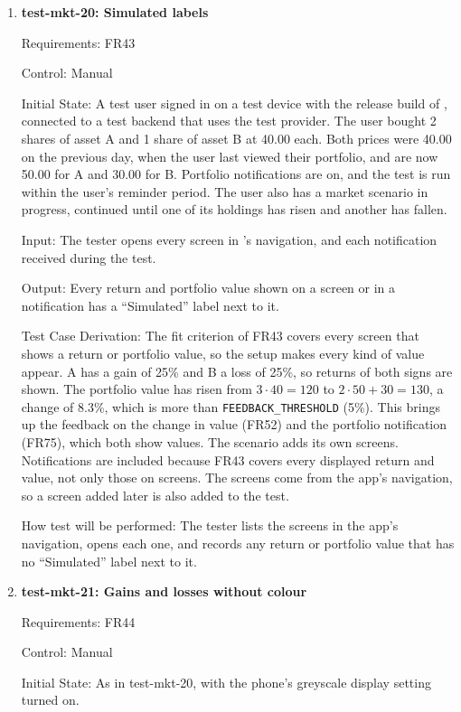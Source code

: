 \documentclass[12pt, titlepage]{article}
\begin{document}
\begin{enumerate}
\item{\textbf{test-mkt-20: Simulated labels}\\}

Requirements: FR43

Control: Manual

Initial State: A test user signed in on a test device with the release build
of \progname{}, connected to a test backend that uses the test provider. The
user bought 2 shares of asset A and 1 share of asset B at 40.00 each. Both
prices were 40.00 on the previous day, when the user last viewed their
portfolio, and are now 50.00 for A and 30.00 for B. Portfolio notifications
are on, and the test is run within the user's reminder period. The user also
has a market scenario in progress, continued until one of its holdings has
risen and another has fallen.

Input: The tester opens every screen in \progname{}'s navigation, and each
notification received during the test.

Output: Every return and portfolio value shown on a screen or in a
notification has a ``Simulated'' label next to it.

Test Case Derivation: The fit criterion of FR43 covers every screen that shows
a return or portfolio value, so the setup makes every kind of value appear. A
has a gain of 25\% and B a loss of 25\%, so returns of both signs are shown.
The portfolio value has risen from $3 \cdot 40 = 120$ to
$2 \cdot 50 + 30 = 130$, a change of 8.3\%, which is more than
\texttt{FEEDBACK\_THRESHOLD} (5\%). This brings up the feedback on the change
in value (FR52) and the portfolio notification (FR75), which both show
values. The scenario adds its own screens. Notifications are included because
FR43 covers every displayed return and value, not only those on screens. The
screens come from the app's navigation, so a screen added later is also added
to the test.

How test will be performed: The tester lists the screens in the app's
navigation, opens each one, and records any return or portfolio value that has
no ``Simulated'' label next to it.

\item{\textbf{test-mkt-21: Gains and losses without colour}\\}

Requirements: FR44

Control: Manual

Initial State: As in test-mkt-20, with the phone's greyscale display setting
turned on.


\end{enumerate}
\end{document}
